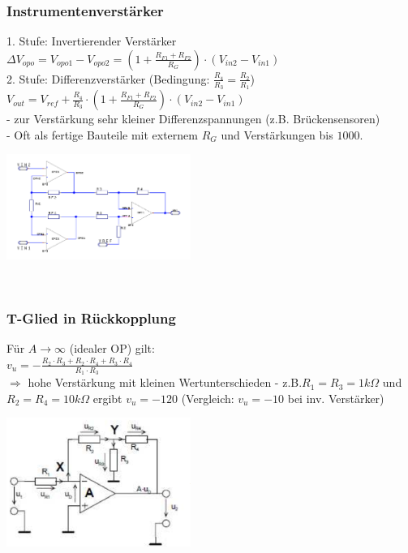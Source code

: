 		\subsubsection{Instrumentenverstärker}
			\begin{minipage}[b]{12cm}
			1. Stufe: Invertierender Verstärker \\
			$\Delta V_{opo}=V_{opo1}-V_{opo2}=(1+\frac{R_{F1}+R_{F2}}{R_G})\cdot(V_{in2}-V_{in1})$
			\smallskip \\
			2. Stufe: Differenzverstärker (Bedingung: $\frac{R_4}{R_3}=\frac{R_2}{R_1}$)\\
			$V_{out}=V_{ref}+\frac{R_4}{R_3}\cdot(1+\frac{R_{F1}+R_{F2}}{R_G})\cdot(V_{in2}-V_{in1})$
			\bigskip \\
			- zur Verstärkung sehr kleiner Differenzspannungen (z.B. Brückensensoren) \\
			- Oft als fertige Bauteile mit externem $R_G$ und Verstärkungen bis $1000$. \\
			\end{minipage}
			\begin{minipage}[t]{6cm}
          		\includegraphics[width=6cm]{./images/instramp.png} 
       	 	\end{minipage}\\
       	 	
       	 \subsubsection{T-Glied in Rückkopplung}
       	 \begin{minipage}[b]{12cm}
       	 	Für $A \to \infty$ (idealer OP) gilt: \smallskip \\
       	 	$v_u=-\frac{R_2 \cdot R_3 + R_2 \cdot R_4 + R_3 \cdot R_4}{R_1 \cdot R_3}$
       	 	\bigskip \\
       	 	$\Longrightarrow$ hohe Verstärkung mit kleinen Wertunterschieden - 
       	 	z.B.$R_1=R_3=1k\Omega$ und $R_2=R_4=10k\Omega$ ergibt $v_u=-120$ 
       	 	(Vergleich: $v_u=-10$ bei inv. Verstärker) \\
       	 \end{minipage}
       	 \begin{minipage}[t]{6cm}
       	 	\includegraphics[width=6cm]{./images/tglied.png}
       	 \end{minipage}
       	 
